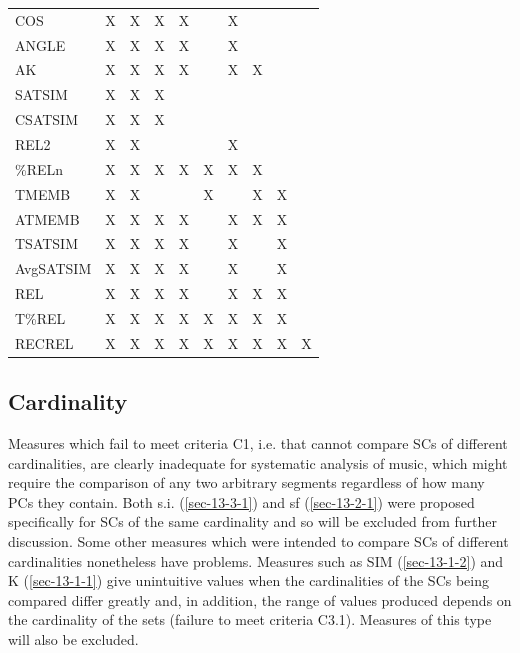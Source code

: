 \documentclass{article}
\begin{document}
\begin{table}[htb]
\begin{center}
\begin{tabular}{llllllllll}
 COS         &  X   &  X   &  X     &  X     &        &  X     &      &      &      \\
 ANGLE       &  X   &  X   &  X     &  X     &        &  X     &      &      &      \\
 AK          &  X   &  X   &  X     &  X     &        &  X     &  X   &      &      \\
 SATSIM      &  X   &  X   &  X     &        &        &        &      &      &      \\
 CSATSIM     &  X   &  X   &  X     &        &        &        &      &      &      \\
 REL2        &  X    &  X    &        &        &        &  X     &      &      &      \\
 \%RELn      &  X   &  X   &  X     &  X     &  X     &  X     &  X   &      &      \\
 TMEMB       &  X   &  X   &        &        &  X     &        &  X   &  X   &      \\
 ATMEMB      &  X   &  X   &  X     &  X     &        &  X     &  X   &  X   &      \\
 TSATSIM     &  X   &  X   &  X     &  X     &        &  X     &      &  X   &      \\
 AvgSATSIM   &  X   &  X   &  X     &  X     &        &  X     &      &  X   &      \\
 REL         &  X   &  X   &  X     &  X     &        &  X     &  X   &  X   &      \\
 T\%REL      &  X   &  X   &  X     &  X     &  X     &  X     &  X   &  X   &      \\
 RECREL      &  X   &  X   &  X     &  X     &  X     &  X     &  X   &  X   &  X   \\
\hline
\end{tabular}
\end{center}
\end{table}
\subsection{Cardinality}
\label{sec-6-2}

Measures which fail to meet criteria C1, i.e. that cannot compare SCs
of different cardinalities, are clearly inadequate for systematic
analysis of music, which might require the comparison of any two
arbitrary segments regardless of how many PCs they contain. Both
s.i. (\ref{sec-13-3-1}) and sf (\ref{sec-13-2-1}) were proposed specifically for SCs of the same
cardinality and so will be excluded from further discussion. Some
other measures which were intended to compare SCs of different
cardinalities nonetheless have problems. Measures such as SIM (\ref{sec-13-1-2})
and K (\ref{sec-13-1-1}) give unintuitive values when the cardinalities of the SCs
being compared differ greatly and, in addition, the range of values
produced depends on the cardinality of the sets (failure to meet
criteria C3.1). Measures of this type will also be excluded.
\end{document}
